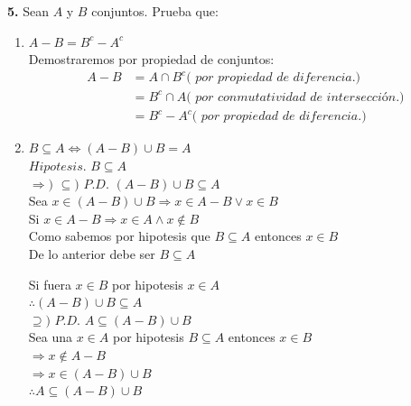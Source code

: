 \documentclass[12pt]{article}
\begin{document}
%
%
\textbf{5.} Sean $A$ y $B$ conjuntos. Prueba que:
\begin{enumerate}[label=\alph*)]
    \item $A - B = B^c - A^c$\\
    Demostraremos por propiedad de conjuntos:
    \begin{align*}
        A - B &= A \cap B^c \textit{( por propiedad de diferencia.)}\\
        &= B^c \cap A \textit{( por conmutatividad de intersección.)}\\
        &= B^c - A^c \textit{( por propiedad de diferencia.)}
    \end{align*}

    \item $B \subseteq A \Longleftrightarrow (A - B) \cup B = A$\\

    $Hipotesis$. $B \subseteq A$\\
    $\Longrightarrow)$ 
    $\subseteq)$ $P.D$. $(A - B) \cup B \subseteq A$\\

    Sea $x \in (A - B) \cup B \Longrightarrow x \in A - B \lor x \in B$\\

    Si $x \in A - B \Longrightarrow x \in A \land x \notin B$\\

    Como sabemos por hipotesis que $B \subseteq A$ entonces $x \in B$\\

    De lo anterior debe ser $B \subseteq A$

    Si fuera $x \in B$ por hipotesis $x \in A$\\

    $\therefore (A - B) \cup B \subseteq A$\\

    $\supseteq)$ $P.D$. $A \subseteq (A - B) \cup B$\\

    Sea una $x \in A$ por hipotesis $B \subseteq A$ entonces $x \in B$\\

    $\Longrightarrow x \notin A - B$\\

    $\Longrightarrow x \in (A - B) \cup B$\\

    $\therefore A \subseteq (A - B) \cup B$\\


\end{enumerate}
\end{document}
